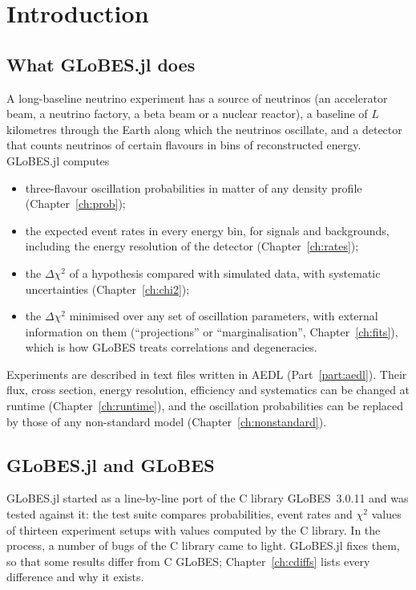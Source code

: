\chapter{Introduction}\label{ch:intro}

\section{What GLoBES.jl does}

A long-baseline neutrino experiment has a source of neutrinos (an accelerator
beam, a neutrino factory, a beta beam or a nuclear reactor), a baseline of
$L$ kilometres through the Earth along which the neutrinos oscillate, and a
detector that counts neutrinos of certain flavours in bins of reconstructed
energy. GLoBES.jl computes
\begin{itemize}
  \item three-flavour oscillation probabilities in matter of any density profile
        (Chapter~\ref{ch:prob});
  \item the expected event rates in every energy bin, for signals and
        backgrounds, including the energy resolution of the detector
        (Chapter~\ref{ch:rates});
  \item the $\Delta\chi^2$ of a hypothesis compared with simulated data, with
        systematic uncertainties (Chapter~\ref{ch:chi2});
  \item the $\Delta\chi^2$ minimised over any set of oscillation parameters,
        with external information on them (``projections'' or
        ``marginalisation'', Chapter~\ref{ch:fits}), which is how GLoBES treats
        correlations and degeneracies.
\end{itemize}
Experiments are described in text files written in AEDL
(Part~\ref{part:aedl}). Their flux, cross section, energy resolution,
efficiency and systematics can be changed at runtime
(Chapter~\ref{ch:runtime}), and the oscillation probabilities can be replaced by
those of any non-standard model (Chapter~\ref{ch:nonstandard}).

\section{GLoBES.jl and GLoBES}

GLoBES.jl started as a line-by-line port of the C library GLoBES~3.0.11 and was
tested against it: the test suite compares probabilities, event rates and
$\chi^2$ values of thirteen experiment setups with values computed by the C
library. In the process, a number of bugs of the C library came to light. GLoBES.jl
fixes them, so that some results differ from C GLoBES; Chapter~\ref{ch:cdiffs}
lists every difference and why it exists.

